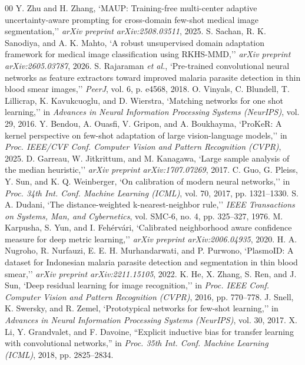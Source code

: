 \documentclass[conference]{IEEEtran}
\begin{document}
\begin{thebibliography}{00}
 Y. Zhu and H. Zhang, `MAUP: Training-free multi-center adaptive uncertainty-aware prompting for cross-domain few-shot medical image segmentation,'' \textit{arXiv preprint arXiv:2508.03511}, 2025.
 S. Sachan, R. K. Sanodiya, and A. K. Mahto, `A robust unsupervised domain adaptation framework for medical image classification using RKHS-MMD,'' \textit{arXiv preprint arXiv:2605.03787}, 2026.
 S. Rajaraman \textit{et al.}, `Pre-trained convolutional neural networks as feature extractors toward improved malaria parasite detection in thin blood smear images,'' \textit{PeerJ}, vol. 6, p. e4568, 2018.
 O. Vinyals, C. Blundell, T. Lillicrap, K. Kavukcuoglu, and D. Wierstra, `Matching networks for one shot learning,'' in \textit{Advances in Neural Information Processing Systems (NeurIPS)}, vol. 29, 2016.
 Y. Bendou, A. Ouasfi, V. Gripon, and A. Boukhayma, `ProKeR: A kernel perspective on few-shot adaptation of large vision-language models,'' in \textit{Proc. IEEE/CVF Conf. Computer Vision and Pattern Recognition (CVPR)}, 2025.
 D. Garreau, W. Jitkrittum, and M. Kanagawa, `Large sample analysis of the median heuristic,'' \textit{arXiv preprint arXiv:1707.07269}, 2017.
 C. Guo, G. Pleiss, Y. Sun, and K. Q. Weinberger, `On calibration of modern neural networks,'' in \textit{Proc. 34th Int. Conf. Machine Learning (ICML)}, vol. 70, 2017, pp. 1321--1330.
 S. A. Dudani, `The distance-weighted k-nearest-neighbor rule,'' \textit{IEEE Transactions on Systems, Man, and Cybernetics}, vol. SMC-6, no. 4, pp. 325--327, 1976.
 M. Karpusha, S. Yun, and I. Fehérvári, `Calibrated neighborhood aware confidence measure for deep metric learning,'' \textit{arXiv preprint arXiv:2006.04935}, 2020.
 H. A. Nugroho, R. Nurfauzi, E. E. H. Murhandarwati, and P. Purwono, `PlasmoID: A dataset for Indonesian malaria parasite detection and segmentation in thin blood smear,'' \textit{arXiv preprint arXiv:2211.15105}, 2022.
 K. He, X. Zhang, S. Ren, and J. Sun, `Deep residual learning for image recognition,'' in \textit{Proc. IEEE Conf. Computer Vision and Pattern Recognition (CVPR)}, 2016, pp. 770--778.
 J. Snell, K. Swersky, and R. Zemel, `Prototypical networks for few-shot learning,'' in \textit{Advances in Neural Information Processing Systems (NeurIPS)}, vol. 30, 2017.
 X. Li, Y. Grandvalet, and F. Davoine, ``Explicit inductive bias for transfer learning with convolutional networks,'' in \textit{Proc. 35th Int. Conf. Machine Learning (ICML)}, 2018, pp. 2825--2834.
\end{thebibliography}
\end{document}
